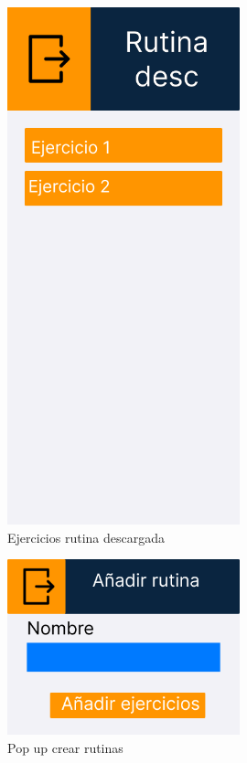 \begin{figure}[H]
   \centering
    \includegraphics[width=0.6\textwidth]{fotos/Frame 52.png}
    \caption{Ejercicios rutina descargada}
    \label{fig:Ejercicios rutina descargada}
\end{figure}
\begin{figure}[H]
   \centering
    \includegraphics[width=0.6\textwidth]{fotos/Frame 65.png}
    \caption{Pop up crear rutinas}
    \label{fig:Pop up crear rutinas}
\end{figure}

